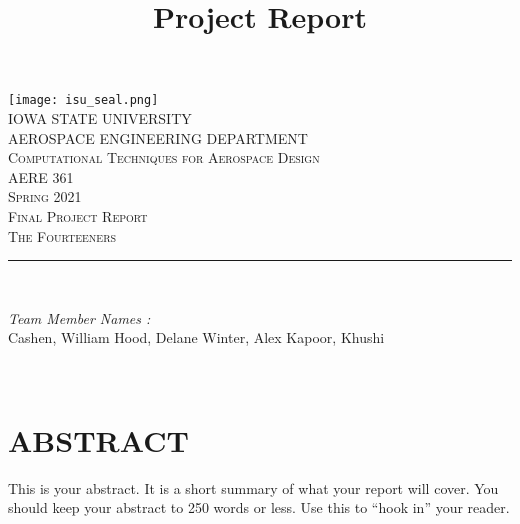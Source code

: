 \documentclass[12pt]{article}
\begin{document}
\title{Project Report}

\begin{titlepage}
	\centering
    \vspace*{0.5 cm}
    \texttt{[image: isu\_seal.png]}\\[1.0 cm]	%
    \textsc{\LARGE IOWA STATE UNIVERSITY}\\[2.0 cm]
    \textsc{\large AEROSPACE ENGINEERING DEPARTMENT}\\[0.2 cm]
    \textsc{\large Computational Techniques for Aerospace Design}\\[0.2 cm]
	\textsc{\Large AERE 361}\\[0.5 cm]				%
	\textsc{\Large Spring 2021}\\[0.5 cm]				%
	\textsc{\Large Final Project Report}\\[0.2 cm]
	\textsc{\Large The Fourteeners}\\[0.2 cm]
	\rule{\linewidth}{0.2 mm} \\[0.4 cm]
	
	
	\begin{minipage}{0.8\textwidth}
		
			\begin{flushleft} 
			\emph{Team Member Names :} \\
			Cashen, William\linebreak
			Hood, Delane\linebreak
			Winter, Alex\linebreak
			Kapoor, Khushi\linebreak
		\end{flushleft}
	\end{minipage}\\[2 cm]
	
	\vfill
	
\end{titlepage}

\tableofcontents
\pagebreak

\section{ABSTRACT}
This is your abstract.  It is a short summary of what your report will cover.  You should keep your abstract to 250 words or less.  Use this to ``hook in'' your reader.
\end{document}
